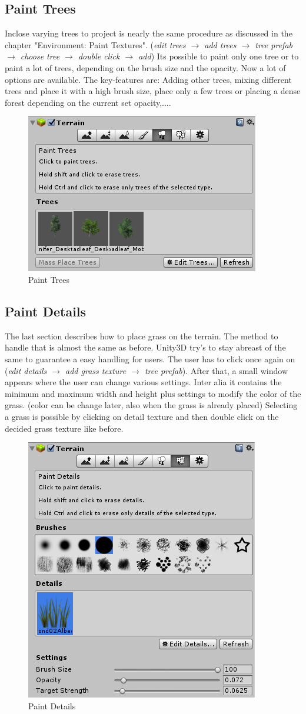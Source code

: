 \documentclass[12pt, a4paper, titlepage]{article}
\begin{document}
\subsection{Paint Trees}
Inclose varying trees to project is nearly the same procedure as discussed in the chapter "Environment: Paint Textures". (\emph{edit trees $\rightarrow$ add trees $\rightarrow$ tree prefab $\rightarrow$ choose tree $\rightarrow$ double click $\rightarrow$ add})
Its possible to paint only one tree or to paint a lot of trees, depending on the brush size and the opacity. Now a lot of options are available. The key-features are: Adding other trees, mixing different trees and place it with a high brush size, place only a few trees or placing a dense forest depending on the current set opacity,....


\begin{figure}[htbp]
  \centering
  \includegraphics[width=.4\textwidth]{pictures/paint_trees}
  \caption{Paint Trees}
  \label{fig:paint_trees}
\end{figure}

\subsection{Paint Details}
The last section describes how to place grass on the terrain. The method to handle that is almost the same as before. Unity3D try’s to 
stay abreast of the same to guarantee a easy handling for users. The user has to click once again on (\emph{edit details $\rightarrow$ add grass texture $\rightarrow$ tree prefab}). After that, a small window appears where the user can change various settings. Inter alia it contains the minimum and maximum width and height plus settings to modify the color of the grass. (color can be change later, also when the grass is already placed) Selecting a grass is possible by clicking on detail texture and then double click on the decided grass texture like before. 


\begin{figure}[htbp]
  \centering
  \includegraphics[width=.4\textwidth]{pictures/paint_details}
  \caption{Paint Details}
  \label{fig:paint_details}
\end{figure}
\end{document}
